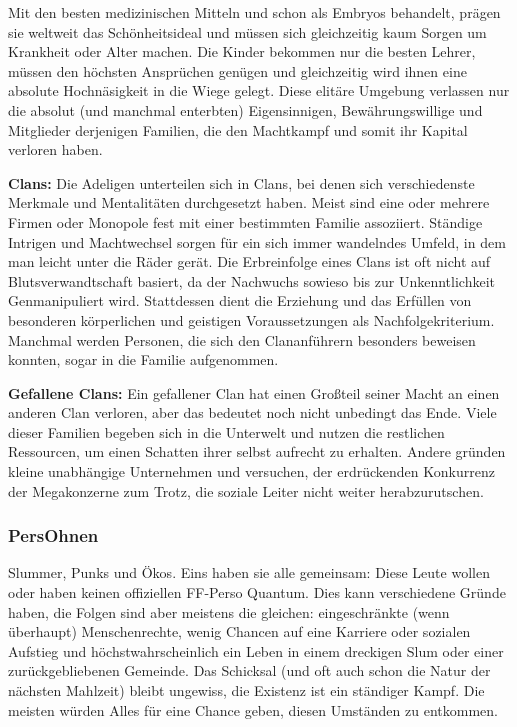 Mit den besten medizinischen Mitteln und schon als Embryos behandelt, prägen sie weltweit das Schönheitsideal und müssen sich gleichzeitig kaum Sorgen um Krankheit oder Alter machen. Die Kinder bekommen nur die besten Lehrer, müssen den höchsten Ansprüchen genügen und gleichzeitig wird ihnen eine absolute Hochnäsigkeit in die Wiege gelegt. Diese elitäre Umgebung verlassen nur die absolut (und manchmal enterbten) Eigensinnigen, Bewährungswillige und Mitglieder derjenigen Familien, die den Machtkampf und somit ihr Kapital verloren haben.

\textbf{Clans:} Die Adeligen unterteilen sich in Clans, bei denen sich verschiedenste Merkmale und Mentalitäten durchgesetzt haben. Meist sind eine oder mehrere Firmen oder Monopole fest mit einer bestimmten Familie assoziiert. Ständige Intrigen und Machtwechsel sorgen für ein sich immer wandelndes Umfeld, in dem man leicht unter die Räder gerät.
Die Erbreinfolge eines Clans ist oft nicht auf Blutsverwandtschaft basiert, da der Nachwuchs sowieso bis zur Unkenntlichkeit Genmanipuliert wird. Stattdessen dient die Erziehung und das Erfüllen von besonderen körperlichen und geistigen Voraussetzungen als \glqq Nachfolgekriterium\grqq. Manchmal werden Personen, die sich den Clananführern besonders beweisen konnten, sogar in die Familie aufgenommen.

\textbf{Gefallene Clans:} Ein gefallener Clan hat einen Großteil seiner Macht an einen anderen Clan verloren, aber das bedeutet noch nicht unbedingt das Ende. Viele dieser Familien begeben sich in die Unterwelt und nutzen die restlichen Ressourcen, um einen Schatten ihrer selbst aufrecht zu erhalten. Andere gründen kleine unabhängige Unternehmen und versuchen, der erdrückenden Konkurrenz der Megakonzerne zum Trotz, die soziale Leiter nicht weiter herabzurutschen.
\subsubsection{PersOhnen}
Slummer, Punks und Ökos. Eins haben sie alle gemeinsam: Diese Leute wollen oder haben keinen offiziellen FF-Perso Quantum. Dies kann verschiedene Gründe haben, die Folgen sind aber meistens die gleichen: eingeschränkte (wenn überhaupt) Menschenrechte, wenig Chancen auf eine Karriere oder sozialen Aufstieg und höchstwahrscheinlich ein Leben in einem dreckigen Slum oder einer zurückgebliebenen Gemeinde. Das Schicksal (und oft auch schon die Natur der nächsten Mahlzeit) bleibt ungewiss, die Existenz ist ein ständiger Kampf. Die meisten würden Alles für eine Chance geben, diesen Umständen zu entkommen.

